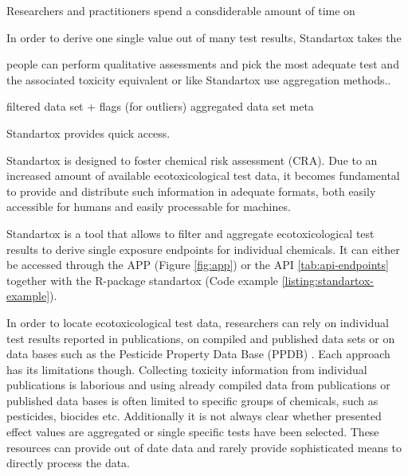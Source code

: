 Researchers and practitioners spend a consdiderable amount of time on  

In order to derive one single value out of many test results, Standartox takes the 

people can perform qualitative assessments and pick the most adequate test and the associated toxicity equivalent or like Standartox use aggregation methods..

filtered data set + flags (for outliers)
aggregated data set
meta




Standartox provides quick access.

Standartox is designed to foster chemical risk assessment (CRA). Due to an increased amount of available ecotoxicological test data, it becomes fundamental to provide and distribute such information in adequate formats, both easily accessible for humans and easily processable for machines. 







Standartox is a tool that allows to filter and aggregate ecotoxicological test results to derive single exposure endpoints for individual chemicals. It can either be accessed through the APP (Figure \ref{fig:app}) or the API \ref{tab:api-endpoints} together with the R-package standartox (Code example \ref{listing:standartox-example}). 











\pagebreak


\pagebreak


\pagebreak




In order to locate ecotoxicological test data, researchers can rely on individual test results reported in publications, on compiled and published data sets \citep{malaj_organic_2014, morrissey_neonicotinoid_2015} or on data bases such as the Pesticide Property Data Base (PPDB) \citep{lewis_international_2016}. Each approach has its limitations though. Collecting toxicity information from individual publications is laborious and using already compiled data from publications or published data bases is often limited to specific groups of chemicals, such as pesticides, biocides etc. Additionally it is not always clear whether presented effect values are aggregated or single specific tests have been selected. These resources can provide out of date data and rarely provide sophisticated means to directly process the data.



